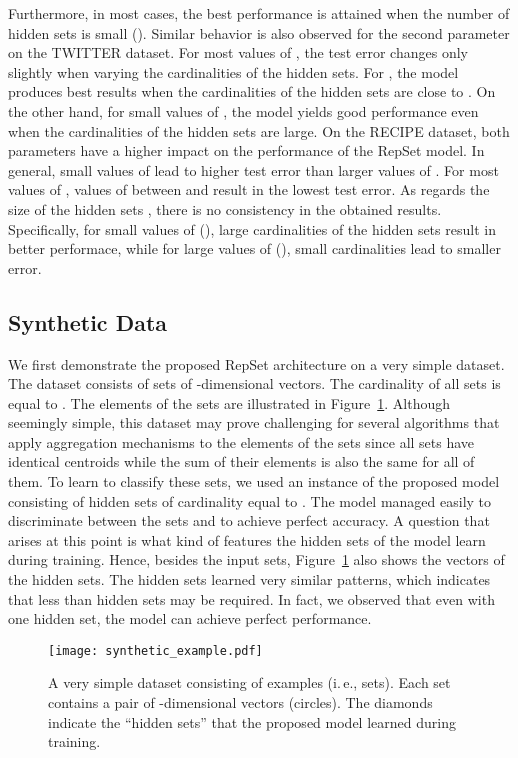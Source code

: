 \documentclass[twoside]{article}
\newcommand{\ie}{i.\,e., }
\begin{document}
Furthermore, in most cases, the best performance is attained when the number of hidden sets is small ().
Similar behavior is also observed for the second parameter on the TWITTER dataset.
For most values of , the test error changes only slightly when varying the cardinalities of the hidden sets.
For , the model produces best results when the cardinalities of the hidden sets  are close to .
On the other hand, for small values of , the model yields good performance even when the cardinalities of the hidden sets  are large.
On the RECIPE dataset, both parameters have a higher impact on the performance of the RepSet model.
In general, small values of  lead to higher test error than larger values of .
For most values of , values of  between  and  result in the lowest test error.
As regards the size of the hidden sets , there is no consistency in the obtained results.
Specifically, for small values of  (), large cardinalities of the hidden sets result in better performace, while for large values of  (), small cardinalities lead to smaller error. 



\subsection{Synthetic Data}
We first demonstrate the proposed RepSet architecture on a very simple dataset.
The dataset consists of  sets of -dimensional vectors.
The cardinality of all sets is equal to .
The elements of the  sets are illustrated in Figure~\ref{fig:toy_example}. 
Although seemingly simple, this dataset may prove challenging for several algorithms that apply aggregation mechanisms to the elements of the sets since all  sets have identical centroids while the sum of their elements is also the same for all of them.
To learn to classify these sets, we used an instance of the proposed model consisting of  hidden sets of cardinality equal to .
The model managed easily to discriminate between the  sets and to achieve perfect accuracy.
A question that arises at this point is what kind of features the hidden sets of the model learn during training.
Hence, besides the input sets, Figure~\ref{fig:toy_example} also shows the vectors of the  hidden sets.
The hidden sets learned very similar patterns, which indicates that less than  hidden sets may be required.
In fact, we observed that even with one hidden set, the model can achieve perfect performance.

\begin{figure}[H]
    \centering
    \texttt{[image: synthetic\_example.pdf]}
    \caption{A very simple dataset consisting of  examples (\ie sets). Each set contains a pair of -dimensional vectors (circles). The diamonds indicate the ``hidden sets'' that the proposed model learned during training.}
    \label{fig:toy_example}
\end{figure}
\end{document}
